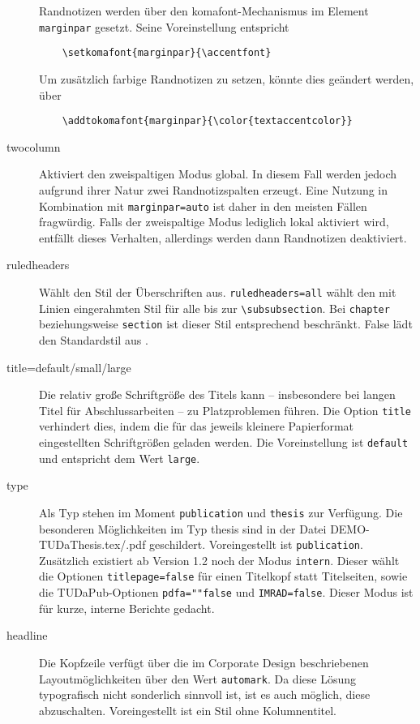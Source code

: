 \documentclass[
	ngerman,
	accentcolor=9c,%
	]{tudapub}
\let\code\texttt
\begin{document}
\begin{description}
	Randnotizen werden über den komafont-Mechanismus \cite[vgl.][]{scrguide} im Element \code{marginpar} gesetzt. Seine Voreinstellung entspricht
	\begin{verbatim}
	\setkomafont{marginpar}{\accentfont}
	\end{verbatim}
	Um zusätzlich farbige Randnotizen zu setzen, könnte dies geändert werden, über
	\begin{verbatim}
	\addtokomafont{marginpar}{\color{textaccentcolor}}
	\end{verbatim}
	\item[twocolumn] Aktiviert den zweispaltigen Modus global. In diesem Fall werden jedoch aufgrund ihrer Natur zwei Randnotizspalten erzeugt. Eine Nutzung in Kombination mit \code{marginpar=auto} ist daher in den meisten Fällen fragwürdig. Falls der zweispaltige Modus lediglich lokal aktiviert wird, entfällt dieses Verhalten, allerdings werden dann Randnotizen deaktiviert.
	\item[ruledheaders] Wählt den Stil der Überschriften aus. \code{ruledheaders=all} wählt den mit Linien eingerahmten Stil für alle bis zur \verb+\subsubsection+. Bei \code{chapter} beziehungsweise \code{section} ist dieser Stil entsprechend beschränkt. False lädt den Standardstil aus \KOMAScript.
	\item[title=default/small/large] Die relativ große Schriftgröße des Titels kann – insbesondere bei langen Titel für Abschlussarbeiten – zu Platzproblemen führen. Die Option \code{title} verhindert dies, indem die für das jeweils kleinere Papierformat eingestellten Schriftgrößen geladen werden. Die Voreinstellung ist \code{default} und entspricht dem Wert \code{large}.
  \item[type] Als Typ stehen im Moment \code{publication} und \code{thesis} zur Verfügung. Die besonderen Möglichkeiten im Typ thesis sind in der Datei DEMO-TUDaThesis.tex/.pdf geschildert. Voreingestellt ist \code{publication}.
	Zusätzlich existiert ab Version 1.2 noch der Modus \code{intern}. Dieser wählt die Optionen \code{titlepage=false} für einen Titelkopf statt Titelseiten, sowie die TUDaPub-Optionen \code{pdfa=""false} und \code{IMRAD=false}. Dieser Modus ist für kurze, interne Berichte gedacht.
	\item[headline] Die Kopfzeile verfügt über die im Corporate Design beschriebenen Layoutmöglichkeiten über den Wert \code{automark}. Da diese Lösung typografisch nicht sonderlich sinnvoll ist, ist es auch möglich, diese abzuschalten. Voreingestellt ist ein Stil ohne Kolumnentitel.

\end{description}
\end{document}
